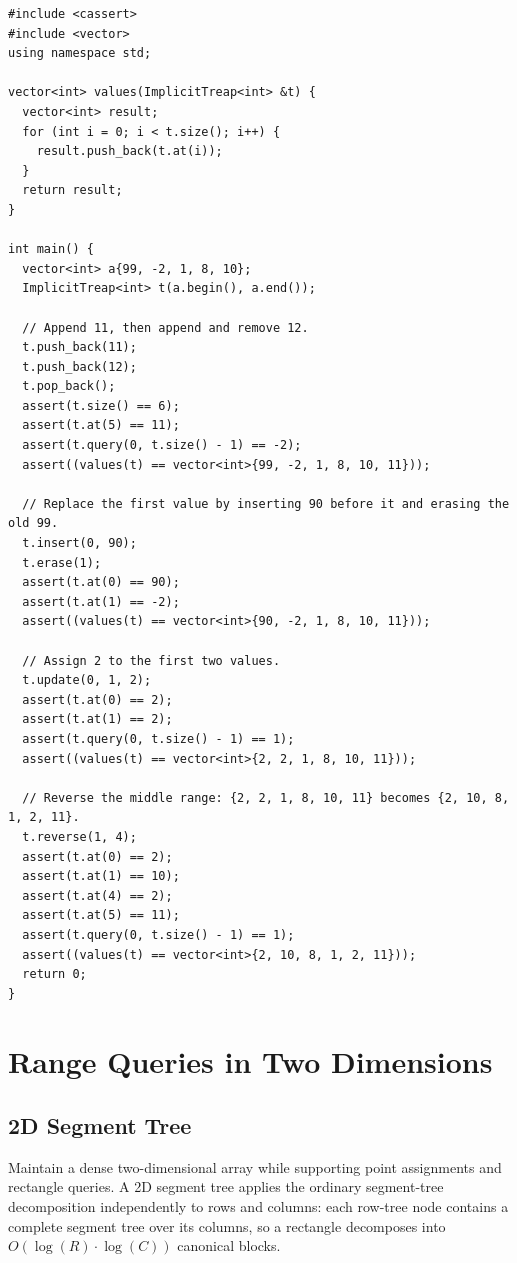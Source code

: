 \begin{lstlisting}[style=cpp]
#include <cassert>
#include <vector>
using namespace std;

vector<int> values(ImplicitTreap<int> &t) {
  vector<int> result;
  for (int i = 0; i < t.size(); i++) {
    result.push_back(t.at(i));
  }
  return result;
}

int main() {
  vector<int> a{99, -2, 1, 8, 10};
  ImplicitTreap<int> t(a.begin(), a.end());

  // Append 11, then append and remove 12.
  t.push_back(11);
  t.push_back(12);
  t.pop_back();
  assert(t.size() == 6);
  assert(t.at(5) == 11);
  assert(t.query(0, t.size() - 1) == -2);
  assert((values(t) == vector<int>{99, -2, 1, 8, 10, 11}));

  // Replace the first value by inserting 90 before it and erasing the old 99.
  t.insert(0, 90);
  t.erase(1);
  assert(t.at(0) == 90);
  assert(t.at(1) == -2);
  assert((values(t) == vector<int>{90, -2, 1, 8, 10, 11}));

  // Assign 2 to the first two values.
  t.update(0, 1, 2);
  assert(t.at(0) == 2);
  assert(t.at(1) == 2);
  assert(t.query(0, t.size() - 1) == 1);
  assert((values(t) == vector<int>{2, 2, 1, 8, 10, 11}));

  // Reverse the middle range: {2, 2, 1, 8, 10, 11} becomes {2, 10, 8, 1, 2, 11}.
  t.reverse(1, 4);
  assert(t.at(0) == 2);
  assert(t.at(1) == 10);
  assert(t.at(4) == 2);
  assert(t.at(5) == 11);
  assert(t.query(0, t.size() - 1) == 1);
  assert((values(t) == vector<int>{2, 10, 8, 1, 2, 11}));
  return 0;
}
\end{lstlisting}

\section{\texorpdfstring{Range Queries in Two Dimensions}{2.6 Range Queries in Two Dimensions}}
\setcounter{section}{6}
\setcounter{subsection}{0}
\subsection{2D Segment Tree}
\label{sec:2.6.1}
Maintain a dense two-dimensional array while supporting point assignments and rectangle queries. A 2D segment tree applies the ordinary segment-tree decomposition independently to rows and columns: each row-tree node contains a complete segment tree over its columns, so a rectangle decomposes into $O(\log\left(R\right) \cdot \log\left(C\right))$ canonical blocks.

